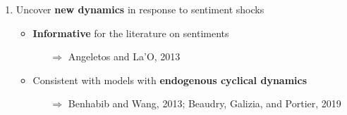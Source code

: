 \documentclass[hyperref={pdfpagelabels=false}]{beamer}
\begin{document}
{\begin{enumerate}
\bigskip

	\item Uncover \textbf{new dynamics} in response to sentiment shocks 
	\begin{itemize}
		\item \textbf{Informative} for the literature on sentiments
		\begin{itemize}
		\item[$\Rightarrow$] Angeletos and La'O, 2013 %
		\end{itemize}
		
		
		
		
		\item Consistent with models with \textbf{endogenous cyclical dynamics} 
		\begin{itemize}
			\item[$\Rightarrow$] Benhabib and Wang, 2013; Beaudry, Galizia, and Portier, 2019
		\end{itemize}
	

		\end{itemize}
	

\end{enumerate}}
\end{document}
